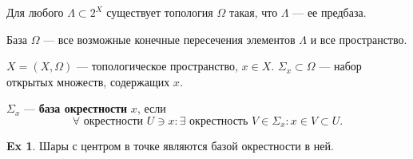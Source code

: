 \documentclass[11pt]{book}
\theoremstyle{definition}
\theoremstyle{plain}
\theoremstyle{plain}
\theoremstyle{definition}
\newtheorem*{ex}{Ex}
\theoremstyle{remark}
\begin{document}
\begin{thm}
    Для любого $ \Lambda \subset 2^{X}$ существует топология $ \Omega $ такая, что $ \Lambda$ --- ее предбаза.

    База $ \Omega $ --- все возможные конечные пересечения элементов $ \Lambda$ и все пространство.
\end{thm}
\begin{defn}
    $ X = (X, \Omega )$ --- топологическое пространство, $ x \in X$.
    $ \Sigma_x \subset \Omega $ --- набор открытых множеств, содержащих $ x$.

    $ \Sigma_x$ --- {\bf база окрестности}  $ x$, если  \[
    \forall \text{ окрестности }  U \ni x: \exists \text{ окрестность } V \in \Sigma_x: x \in V \subset U
    .\] 
\end{defn}
\begin{ex}
    Шары с центром в точке являются базой окрестности в ней. 
\end{ex}
\end{document}
